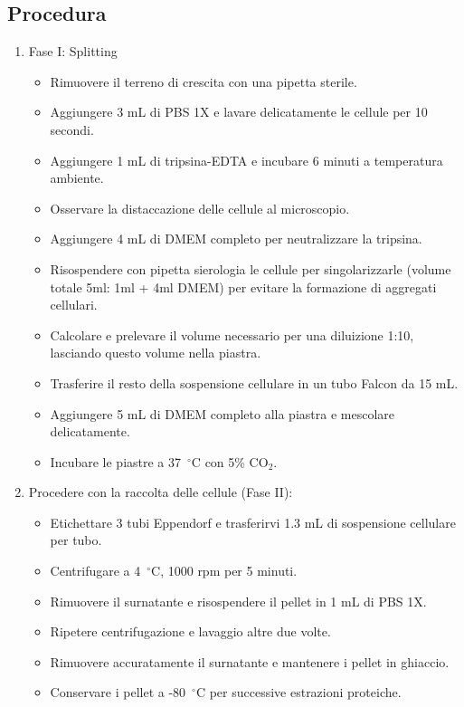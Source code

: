 \subsection{Procedura}
\begin{enumerate}\footnotesize
  \item Fase I: Splitting
  \begin{itemize}
    \item Rimuovere il terreno di crescita con una pipetta sterile.
    \item Aggiungere 3 mL di PBS 1X e lavare delicatamente le cellule per 10 secondi.
    \item Aggiungere 1 mL di tripsina-EDTA e incubare 6 minuti a temperatura ambiente.
    \item Osservare la distaccazione delle cellule al microscopio.
    \item Aggiungere 4 mL di DMEM completo per neutralizzare la tripsina.
    \item Risospendere con pipetta sierologia le cellule per singolarizzarle (volume totale 5ml: 1ml + 4ml DMEM) per evitare la formazione di aggregati cellulari.
    \item Calcolare e prelevare il volume necessario per una diluizione 1:10, lasciando questo volume nella piastra.
    \item Trasferire il resto della sospensione cellulare in un tubo Falcon da 15 mL.
    \item Aggiungere 5 mL di DMEM completo alla piastra e mescolare delicatamente.
    \item Incubare le piastre a 37~$^\circ$C con 5\% CO$_2$.
  \end{itemize}
  \item Procedere con la raccolta delle cellule (Fase II):
  \begin{itemize}
    \item Etichettare 3 tubi Eppendorf e trasferirvi 1.3 mL di sospensione cellulare per tubo.
    \item Centrifugare a 4~$^\circ$C, 1000 rpm per 5 minuti.
    \item Rimuovere il surnatante e risospendere il pellet in 1 mL di PBS 1X.
    \item Ripetere centrifugazione e lavaggio altre due volte.
    \item Rimuovere accuratamente il surnatante e mantenere i pellet in ghiaccio.
    \item Conservare i pellet a -80~$^\circ$C per successive estrazioni proteiche.
  \end{itemize}
\end{enumerate}


